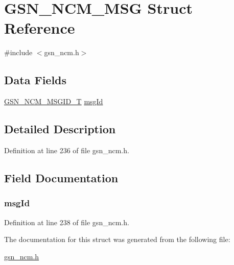 \hypertarget{a00160}{
\section{GSN\_\-NCM\_\-MSG Struct Reference}
\label{a00160}
}


{\ttfamily \#include $<$gsn\_\-ncm.h$>$}

\subsection*{Data Fields}
\begin{DoxyCompactItemize}
\item 
\hyperlink{a00688_ga1df95350543744eb99d0ce7433e6db16}{GSN\_\-NCM\_\-MSGID\_\-T} \hyperlink{a00160_aff37db78951ee7ae60b93950a98714e2}{msgId}
\end{DoxyCompactItemize}


\subsection{Detailed Description}


Definition at line 236 of file gsn\_\-ncm.h.



\subsection{Field Documentation}
\hypertarget{a00160_aff37db78951ee7ae60b93950a98714e2}{
\subsubsection[{msgId}]{ {\bf msgId}}}
\label{a00160_aff37db78951ee7ae60b93950a98714e2}


Definition at line 238 of file gsn\_\-ncm.h.



The documentation for this struct was generated from the following file:\begin{DoxyCompactItemize}
\item 
\hyperlink{a00529}{gsn\_\-ncm.h}\end{DoxyCompactItemize}
